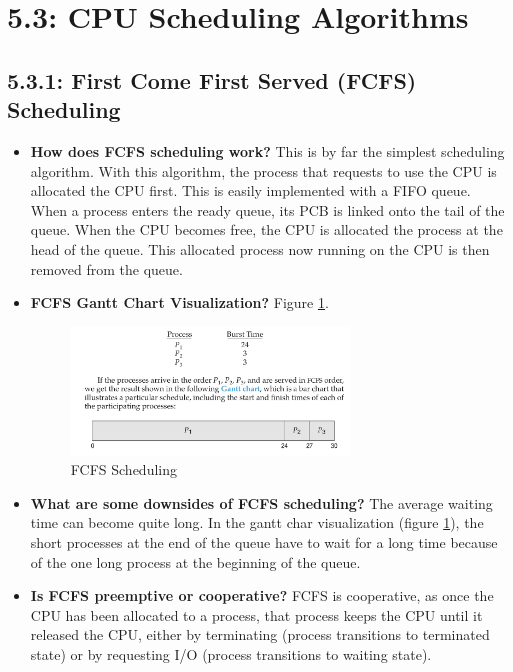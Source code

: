 \documentclass[12pt]{article}
\begin{document}
\section*{5.3: CPU Scheduling Algorithms}

\subsection*{5.3.1: First Come First Served (FCFS) Scheduling}

\begin{itemize}
    \item \textbf{How does FCFS scheduling work?} This is by far the simplest scheduling algorithm. With this algorithm, the process that requests to use the CPU is allocated the CPU first. This is easily implemented with a FIFO queue. When a process enters the ready queue, its PCB is linked onto the tail of the queue. When the CPU becomes free, the CPU is allocated the process at the head of the queue. This allocated process now running on the CPU is then removed from the queue.
    \item \textbf{FCFS Gantt Chart Visualization?} Figure \ref{fig:fcfs-scheduling}.
        \begin{figure}[ht]
            \centering
            \includegraphics[width=0.7\textwidth]{figures/fcfs-scheduling.jpg}
            \caption{FCFS Scheduling}
            \label{fig:fcfs-scheduling}
        \end{figure}
    \item \textbf{What are some downsides of FCFS scheduling?} The average waiting time can become quite long. In the gantt char visualization (figure \ref{fig:fcfs-scheduling}), the short processes at the end of the queue have to wait for a long time because of the one long process at the beginning of the queue.
    \item \textbf{Is FCFS preemptive or cooperative?} FCFS is cooperative, as once the CPU has been allocated to a process, that process keeps the CPU until it released the CPU, either by terminating (process transitions to terminated state) or by requesting I/O (process transitions to waiting state).
\end{itemize}
\end{document}
